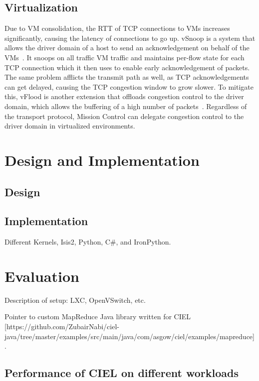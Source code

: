 \documentclass[a4paper,12pt,twoside,openright]{report}
\begin{document}
\section{Virtualization}
Due to VM consolidation, the RTT of TCP connections to VMs increases
significantly, causing the latency of connections to go up. vSnoop is a system
that allows the driver domain of a host to send an acknowledgement on behalf of
the VMs~\cite{Kangarlou:2010:VIT}. It snoops on all traffic VM traffic and
maintains per-flow state for each TCP connection which it then uses to enable
early acknowledgement of packets. The same problem afflicts the transmit path as
well, as TCP acknowledgements can get delayed, causing the TCP congestion window
to grow slower. To mitigate this, vFlood is another extension that offloads
congestion control to the driver domain, which allows the buffering of a high
number of packets~\cite{Gamage:2011:OFI}. Regardless of the transport protocol,
Mission Control can delegate congestion control to the driver domain in
virtualized environments.

\chapter{Design and Implementation}\label{chapter:designImplementation}

\section{Design}

\section{Implementation}
Different Kernels, Isis2, Python, C\#, and IronPython.

\chapter{Evaluation}\label{chapter:evaluation}

Description of setup: LXC, OpenVSwitch, etc.

Pointer to custom MapReduce Java library written for CIEL
[https://github.com/ZubairNabi/ciel-java/tree/master/examples/src/main/java/com/asgow/ciel/examples/mapreduce].

\section{Performance of CIEL on different workloads}
\end{document}
